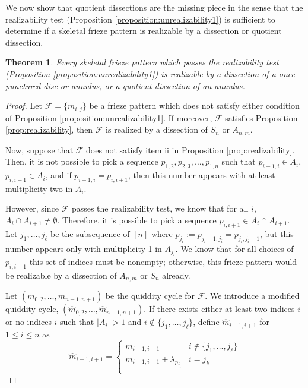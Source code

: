 \documentclass[12pt]{article}
\newtheorem{theorem}{Theorem}
\theoremstyle{remark}
\newcommand*{\F}{\mathcal{F}}
\begin{document}
We now show that quotient dissections are the missing piece in the sense that the realizability test (Proposition \ref{proposition:unrealizability1}) is sufficient to determine if a skeletal frieze pattern is realizable by a dissection or quotient dissection. 


\begin{theorem}\label{thm:QuotientDissections} 
Every skeletal frieze pattern which passes the realizability test (Proposition \ref{proposition:unrealizability1}) is realizable by a dissection of a once-punctured disc or annulus, or a quotient dissection of an annulus. 
\end{theorem}

\begin{proof}
Let $\F = \{m_{i,j}\}$ be a frieze pattern which does not satisfy either condition of Proposition \ref{proposition:unrealizability1}. If moreover, $\F$ satisfies Proposition  \ref{prop:realizability}, then $\F$ is realized by a dissection of $S_n$ or $A_{n,m}$. 

Now, suppose that $\F$ does not satisfy item ii in Proposition  \ref{prop:realizability}. Then, it is not possible to pick a sequence $p_{1,2},p_{2,3},\ldots,p_{1,n}$ such that $p_{i-1,i} \in A_i$, $p_{i,i+1} \in A_i$, and if $p_{i-1,i} = p_{i,i+1}$, then this number appears with at least multiplicity two in $A_i$. 

However, since $\mathcal{F}$ passes the realizability test, we know that for all $i$, $A_i \cap A_{i+1} \neq \emptyset$.
Therefore, it is possible to pick a sequence $p_{i,i+1} \in A_i \cap A_{i+1}$. Let $j_1,\ldots,j_\ell$ be the subsequence of $[n]$ where $p_{j_i}:= p_{j_i -1,j_i} = p_{j_i,j_i+1}$, but this number appears only with multiplicity 1 in $A_{j_i}$. We know that for all choices of $p_{i,i+1}$ this set of indices must be nonempty; otherwise, this frieze pattern would be realizable by a dissection of $A_{n,m}$ or $S_n$ already. 

Let $(m_{0,2},\ldots,m_{n-1,n+1})$ be the quiddity cycle for $\F$. We introduce a modified quiddity cycle, $(\widehat{m}_{0,2},\ldots,\widehat{m}_{n-1,n+1})$. If there exists either at least two indices $i$ or no indices $i$ such that $\vert A_i \vert > 1$ and $i \notin \{j_1,\ldots,j_\ell\}$, define $\widehat{m}_{i-1,i+1}$ for $1 \leq i \leq n$ as 
\[
\widehat{m}_{i-1,i+1} = \begin{cases} m_{i-1,i+1} & i \notin \{j_1,\ldots,j_\ell\} \\ m_{i-1,i+1} + \lambda_{p_{j_k}} & i = j_k
 \\ \end{cases}
\]


\end{proof}
\end{document}
